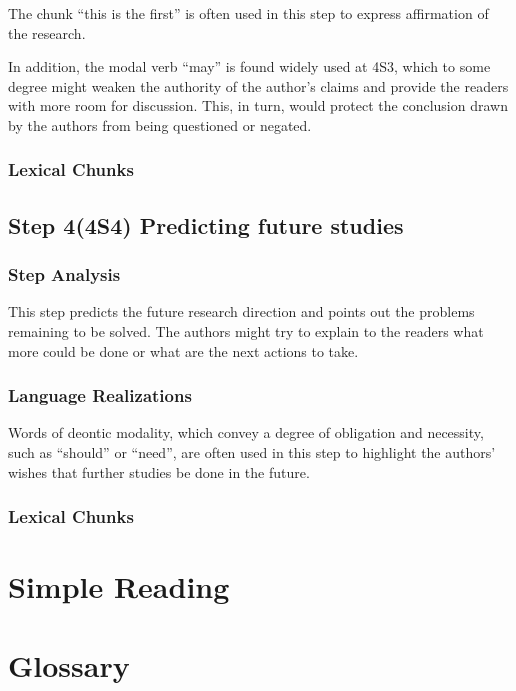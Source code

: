 \documentclass{ctexbook}
\begin{document}
    The chunk ``this is the first'' is often used in this step to express affirmation of the research.
    
    In addition, the modal verb ``may'' is found widely used at 4S3, which to some degree might weaken the authority of the author's claims and provide the readers with more room for discussion. This, in turn, would protect the conclusion drawn by the authors from being questioned or negated.


    \subsubsection{Lexical Chunks}

  \subsection{Step 4(4S4) Predicting future studies}
    \subsubsection{Step Analysis}

    This step predicts the future research direction and points out the problems remaining to be solved. The authors might try to explain to the readers what more could be done or what are the next actions to take.

    \subsubsection{Language Realizations}

    Words of deontic modality, which convey a degree of obligation and necessity, such as ``should'' or ``need'', are often used in this step to highlight the authors' wishes that further studies be done in the future.

    \subsubsection{Lexical Chunks}

\section{Simple Reading}

\section{Glossary}


\restoregeometry

\backmatter



	
\end{document}
